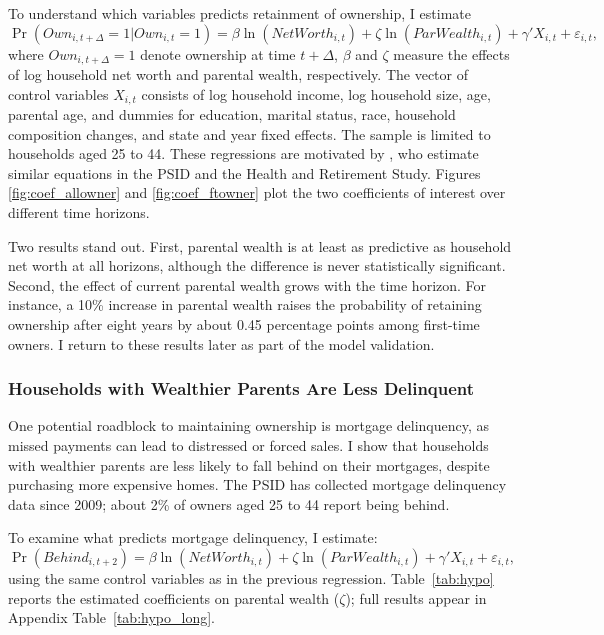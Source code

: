 \documentclass[12pt]{article}
\begin{document}
To understand which variables predicts retainment of ownership, I estimate
\begin{equation}	\label{eq:regmaintain}
	\Pr\left(Own_{i,t+\Delta}=1|Own_{i,t}=1\right)
	= \beta\ln(NetWorth_{i,t}) + \zeta\ln(ParWealth_{i,t})
	  + \gamma' X_{i,t} + \varepsilon_{i,t},
\end{equation}
where $Own_{i,t+\Delta}=1$ denote ownership at time $t+\Delta$, $\beta$ and $\zeta$ measure the effects of log household net worth and parental wealth, respectively. The vector of control variables  $X_{i,t}$ consists of log household income, log household size, age, parental age, and dummies for  education, marital status, race, household composition changes, and state and year fixed effects.  The sample is limited to households aged 25 to 44. These regressions are motivated by \cite{bond2021role}, who estimate similar equations in the PSID and the Health and Retirement Study. Figures \ref{fig:coef_allowner} and \ref{fig:coef_ftowner} plot the two coefficients of interest over different time horizons.

Two results stand out. First, parental wealth is at least as predictive as household net worth at all horizons, although the difference is never statistically significant. Second, the effect of current parental wealth grows with the time horizon. For instance, a 10\% increase in parental wealth raises the probability of retaining ownership after eight years by about 0.45 percentage points among first-time owners. I return to these results later as part of the model validation.


\subsubsection{Households with Wealthier Parents Are Less Delinquent} 
One potential roadblock to maintaining ownership is mortgage delinquency, as missed payments can lead to distressed or forced sales. I show that households with wealthier parents are less likely to fall behind on their mortgages, despite purchasing more expensive homes. The PSID has collected mortgage delinquency data since 2009; about 2\% of owners aged 25 to 44 report being behind.

To examine what predicts mortgage delinquency, I estimate: 
\begin{equation}\label{eq:regbehind}
\Pr(Behind_{i,t+2}) = \beta\ln(NetWorth_{i,t}) + \zeta\ln(ParWealth_{i,t}) + \gamma' X_{i,t} + \varepsilon_{i,t},
\end{equation}
using the same control variables as in the previous regression. Table~\ref{tab:hypo} reports the estimated coefficients on parental wealth ($\zeta$); full results appear in Appendix Table~\ref{tab:hypo_long}.  
\end{document}
